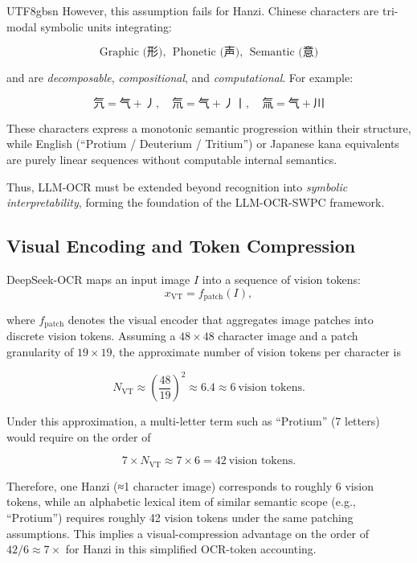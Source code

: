 \documentclass[conference]{IEEEtran}
\begin{document}
\begin{CJK*}{UTF8}{gbsn}
However, this assumption fails for Hanzi.  
Chinese characters are tri-modal symbolic units integrating:

\[
\text{Graphic (形)},~~\text{Phonetic (声)},~~\text{Semantic (意)}
\]

and are \emph{decomposable}, \emph{compositional}, and \emph{computational}.  
For example:

\[
\text{氕} = \text{气} + \text{丿}, \quad
\text{氘} = \text{气} + \text{丿丨}, \quad
\text{氚} = \text{气} + \text{川}
\]

These characters express a monotonic semantic progression within their structure, while English (``Protium / Deuterium / Tritium'') or Japanese kana equivalents are purely linear sequences without computable internal semantics.

Thus, LLM-OCR must be extended beyond recognition into \emph{symbolic interpretability}, forming the foundation of the LLM-OCR-SWPC framework.

\subsection{Visual Encoding and Token Compression}
DeepSeek-OCR maps an input image \(I\) into a sequence of vision tokens:
\begin{equation}
x_{\mathrm{VT}} = f_{\mathrm{patch}}(I),
\end{equation}

where \(f_{\mathrm{patch}}\) denotes the visual encoder that aggregates image patches into discrete vision tokens.  
Assuming a \(48\times48\) character image and a patch granularity of \(19\times19\), the approximate number of vision tokens per character is

\begin{equation}
N_{\mathrm{VT}} \approx \left(\frac{48}{19}\right)^2 \approx 6.4 \approx 6 \ \text{vision tokens}.
\end{equation}

Under this approximation, a multi-letter term such as “Protium” (7 letters) would require on the order of

\begin{equation}
7 \times N_{\mathrm{VT}} \approx 7 \times 6 = 42 \ \text{vision tokens}. 
\end{equation}

Therefore, one Hanzi (≈1 character image) corresponds to roughly 6 vision tokens, while an alphabetic lexical item of similar semantic scope (e.g., “Protium”) requires roughly 42 vision tokens under the same patching assumptions. This implies a visual-compression advantage on the order of $42/6 \approx 7\times$
for Hanzi in this simplified OCR-token accounting.


\end{CJK*}
\end{document}
